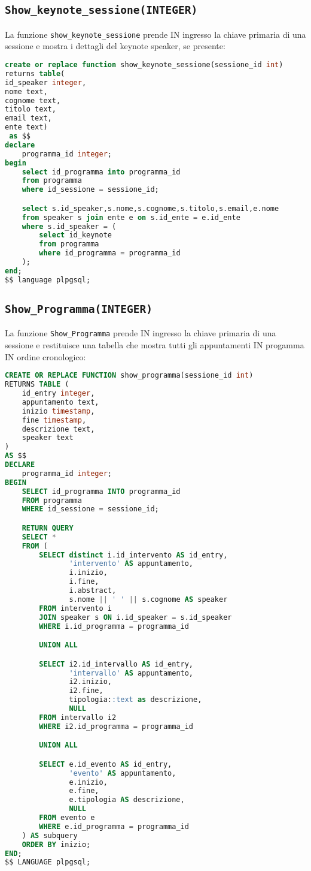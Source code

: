 \subsection{\texttt{Show\_keynote\_sessione(INTEGER)}}
La funzione \texttt{show\_keynote\_sessione} prende IN ingresso la chiave primaria di una sessione e mostra i dettagli del keynote speaker, se presente:
\begin{lstlisting}[language=SQL,style=mystyle]
create or replace function show_keynote_sessione(sessione_id int)
returns table(
id_speaker integer,
nome text,
cognome text,
titolo text,
email text,
ente text) 
 as $$
declare
    programma_id integer;
begin
    select id_programma into programma_id
    from programma
    where id_sessione = sessione_id;

    select s.id_speaker,s.nome,s.cognome,s.titolo,s.email,e.nome
    from speaker s join ente e on s.id_ente = e.id_ente
    where s.id_speaker = (
        select id_keynote
        from programma
        where id_programma = programma_id
    );
end;
$$ language plpgsql;
\end{lstlisting}
\subsection{\texttt{Show\_Programma(INTEGER)}}
La funzione \texttt{Show\_Programma} prende IN ingresso la chiave primaria di una sessione e restituisce una tabella che mostra tutti gli appuntamenti IN progamma IN ordine cronologico:
\begin{lstlisting}[language=SQL,style=mystyle]
CREATE OR REPLACE FUNCTION show_programma(sessione_id int)
RETURNS TABLE (
    id_entry integer,
    appuntamento text,
    inizio timestamp,
    fine timestamp,
    descrizione text,
    speaker text
)
AS $$
DECLARE
    programma_id integer;
BEGIN
    SELECT id_programma INTO programma_id
    FROM programma
    WHERE id_sessione = sessione_id;

    RETURN QUERY
    SELECT *
    FROM (
        SELECT distinct i.id_intervento AS id_entry,
               'intervento' AS appuntamento,
               i.inizio,
               i.fine,
               i.abstract,
               s.nome || ' ' || s.cognome AS speaker
        FROM intervento i
        JOIN speaker s ON i.id_speaker = s.id_speaker
        WHERE i.id_programma = programma_id

        UNION ALL

        SELECT i2.id_intervallo AS id_entry,
               'intervallo' AS appuntamento,
               i2.inizio,
               i2.fine,
               tipologia::text as descrizione,
               NULL
        FROM intervallo i2
        WHERE i2.id_programma = programma_id

        UNION ALL

        SELECT e.id_evento AS id_entry,
               'evento' AS appuntamento,
               e.inizio,
               e.fine,
               e.tipologia AS descrizione,
               NULL
        FROM evento e
        WHERE e.id_programma = programma_id
    ) AS subquery
    ORDER BY inizio;
END;
$$ LANGUAGE plpgsql;
\end{lstlisting}

